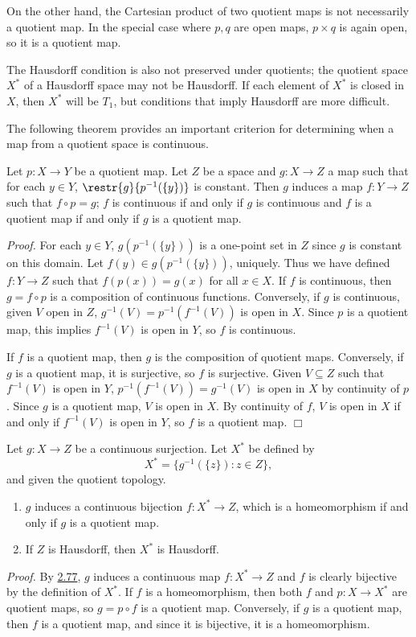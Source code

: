 On the other hand, the Cartesian product of two quotient maps is not necessarily a quotient map. In the special case where $p, q$ are open maps, $p \times q$ is again open, so it is a quotient map.

The Hausdorff condition is also not preserved under quotients; the quotient space $X^*$ of a Hausdorff space may not be Hausdorff. If each element of $X^*$ is closed in $X$, then $X^*$ will be $T_1$, but conditions that imply Hausdorff are more difficult.

The following theorem provides an important criterion for determining when a map from a quotient space is continuous.
\begin{theorem}\label{2.77}
    Let $p:X \rightarrow Y$ be a quotient map. Let $Z$ be a space and $g: X \rightarrow Z$ a map such that for each $y \in Y$, $\restr{g}{p^{-1}(\{y\})}$ is constant. Then $g$ induces a map $f: Y \rightarrow Z$ such that $f \circ p = g$; $f$ is continuous if and only if $g$ is continuous and $f$ is a quotient map if and only if $g$ is a quotient map.
\end{theorem}
{\it Proof.} For each $y \in Y$, $g(p^{-1}(\{y\}))$ is a one-point set in $Z$ since $g$ is constant on this domain. Let $f(y) \in g(p^{-1}(\{y\}))$, uniquely. Thus we have defined $f: Y \rightarrow Z$ such that $f(p(x)) = g(x)$ for all $x \in X$. If $f$ is continuous, then $g = f \circ p$ is a composition of continuous functions. Conversely, if $g$ is continuous, given $V$ open in $Z$, $g^{-1}(V) = p^{-1}(f^{-1}(V))$ is open in $X$. Since $p$ is a quotient map, this implies $f^{-1}(V)$ is open in $Y$, so $f$ is continuous.

If $f$ is a quotient map, then $g$ is the composition of quotient maps. Conversely, if $g$ is a quotient map, it is surjective, so $f$ is surjective. Given $V \subseteq Z$ such that $f^{-1}(V)$ is open in $Y$, $p^{-1}(f^{-1}(V)) = g^{-1}(V)$ is open in $X$ by continuity of $p$. Since $g$ is a quotient map, $V$ is open in $X$. By continuity of $f$, $V$ is open in $X$ if and only if $f^{-1}(V)$ is open in $Y$, so $f$ is a quotient map. $\Box$

\begin{corollary}\label{2.78}
    Let $g: X \rightarrow Z$ be a continuous surjection. Let $X^*$ be defined by
    $$X^* = \{g^{-1}(\{z\}) : z \in Z\},$$
    and given the quotient topology.
    \begin{enumerate}
        \item $g$ induces a continuous bijection $f: X^* \rightarrow Z$, which is a homeomorphism if and only if $g$ is a quotient map.
        \item If $Z$ is Hausdorff, then $X^*$ is Hausdorff.
    \end{enumerate}
\end{corollary}
{\it Proof.} By \hyperref[2.77]{2.77}, $g$ induces a continuous map $f: X^* \rightarrow Z$ and $f$ is clearly bijective by the definition of $X^*$. If $f$ is a homeomorphism, then both $f$ and $p: X \rightarrow X^*$ are quotient maps, so $g = p \circ f$ is a quotient map. Conversely, if $g$ is a quotient map, then $f$ is a quotient map, and since it is bijective, it is a homeomorphism.

